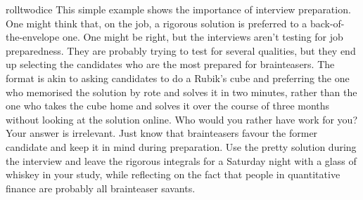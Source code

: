 \begin{answer}{rolltwodice}
This simple example shows the importance of interview preparation.
One might think that, on the job, a rigorous solution is preferred to a back-of-the-envelope one.
One might be right, but the interviews aren't testing for job preparedness.
They are probably trying to test for several qualities, but they end up selecting the candidates who are the most prepared for brainteasers.
The format is akin to asking candidates to do a Rubik's cube and preferring the one who memorised the solution by rote and solves it in two minutes, rather than the one who takes the cube home and solves it over the course of three months without looking at the solution online.
Who would you rather have work for you?
Your answer is irrelevant.
Just know that brainteasers favour the former candidate and keep it in mind during preparation.
Use the pretty solution during the interview and leave the rigorous integrals for a Saturday night with a glass of whiskey in your study, while reflecting on the fact that people in quantitative finance are probably all brainteaser savants.
\end{answer}
